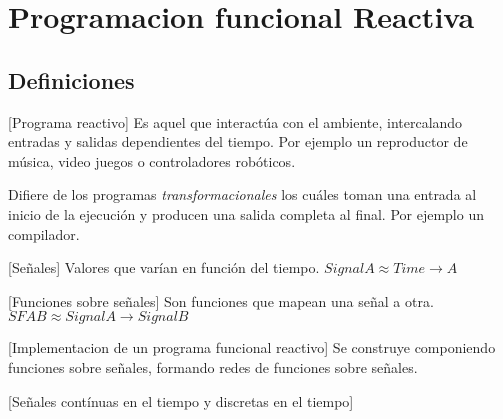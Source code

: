

\section{Programacion funcional Reactiva}

\subsection{Definiciones}

[Programa reactivo] Es aquel que interactúa con el ambiente, 
intercalando entradas y salidas dependientes del tiempo. Por
ejemplo un reproductor de música, video juegos o controladores
robóticos.

Difiere de los programas \emph{transformacionales} los
cuáles toman una entrada al inicio de la ejecución y 
producen una salida completa al final. Por ejemplo un
compilador.

[Señales] Valores que varían en función del tiempo.
  $Signal A \approx Time \rightarrow A$

[Funciones sobre señales] Son funciones que mapean
una señal a otra.
  $SF A B \approx Signal A \rightarrow Signal B$

[Implementacion de un programa funcional reactivo] Se construye
componiendo funciones sobre señales, formando redes de funciones
sobre señales.

[Señales contínuas en el tiempo y discretas en el tiempo]





